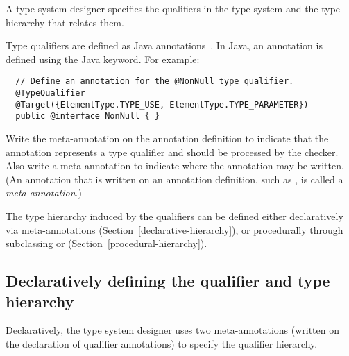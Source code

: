 A type system designer specifies the qualifiers in the type system and
the type hierarchy that relates them.


Type qualifiers are defined as Java annotations~\cite{JSR269}.  In Java, an
annotation is defined using the Java  keyword.
For example:

\begin{Verbatim}
  // Define an annotation for the @NonNull type qualifier.
  @TypeQualifier
  @Target({ElementType.TYPE_USE, ElementType.TYPE_PARAMETER})
  public @interface NonNull { }
\end{Verbatim}

\noindent
Write the  meta-annotation on the annotation definition
to indicate that the annotation represents a type qualifier
and should be processed by the checker.
Also write a 
meta-annotation to indicate where the annotation may be written.
(An annotation that is written on an annotation
definition, such as , is called a \emph{meta-annotation}.)


The type hierarchy induced by the qualifiers can be defined either
declaratively via meta-annotations (Section~\ref{declarative-hierarchy}), or procedurally through
subclassing  or
 (Section~\ref{procedural-hierarchy}).


\subsection{Declaratively defining the qualifier and type hierarchy\label{declarative-hierarchy}}

Declaratively, the type system designer uses two meta-annotations (written
on the declaration of qualifier annotations) to specify the qualifier
hierarchy.

